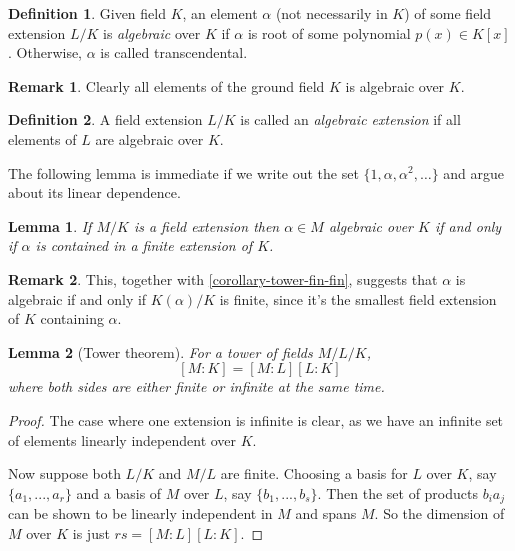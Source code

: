 \documentclass[12pt]{article}
\newtheorem{lemma}{Lemma}[subsection]
\theoremstyle{remark}
\theoremstyle{definition}
\newtheorem{remark}{Remark}[subsection]
\newtheorem{definition}{Definition}[subsection]
\begin{document}
        \begin{definition}%
            Given field $K$, an element $\alpha$ (not necessarily in $K$) of some field extension $L/K$ is \textit{algebraic} over $K$ if $\alpha$ is root of some polynomial $p(x) \in K[x]$. Otherwise, $\alpha$ is called transcendental. 
        \end{definition}
        \begin{remark}
            Clearly all elements of the ground field $K$ is algebraic over $K$.
        \end{remark}
        \begin{definition}%
            A field extension $L/K$ is called an \textit{algebraic extension} if all elements of $L$ are algebraic over $K$. 
        \end{definition}
        \noindent The following lemma is immediate if we write out the set $\{1,\alpha, \alpha^2,\dots\}$ and argue about its linear dependence.
        \begin{lemma}
            If $M/K$ is a field extension then $\alpha \in M$ algebraic over $K$ if and only if $\alpha$ is contained in a finite extension of $K$.
        \end{lemma}
        \begin{remark}
            This, together with \autoref{corollary-tower-fin-fin}, suggests that $\alpha$ is algebraic if and only if $K(\alpha)/K$ is finite, since it's the smallest field extension of $K$ containing $\alpha$.
        \end{remark}
        \begin{lemma}[Tower theorem]\label{theorem-tower}
            For a tower of fields $M/L/K$, 
            $$[M : K] = [M:L][L:K]$$
            where both sides are either finite or infinite at the same time. 
        \end{lemma}
        \begin{proof}
            The case where one extension is infinite is clear, as we have an infinite set of elements linearly independent over $K$. 
            
            Now suppose both $L/K$ and $M/L$ are finite. Choosing a basis for $L$ over $K$, say $\{a_1, ...,  a_r\}$ and a basis of $M$ over $L$, say $\{b_1, ..., b_s\}$. Then the set of  products $b_i a_j$ can be shown to be linearly independent in $M$ and spans $M$. So the dimension of $M$ over $K$ is just $rs = [M:L][L:K]$. 
        \end{proof}
        
\end{document}
